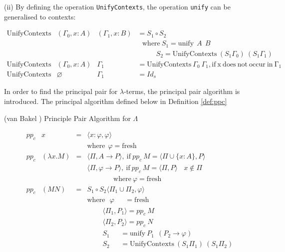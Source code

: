 \noindent (ii) By defining the operation \texttt{UnifyContexts}, the operation \texttt{unify} can be generalised to contexts:

\begin{equation*}
\begin{array}{llll}
\mathrm{UnifyContexts} & (\Gamma _0,x:A) & (\Gamma _1,x:B) & = S_1\circ S_2\\
&&&\ \ \ \mathrm{where}\ S_1 = \mathrm{unify}\ \ A\ \ B\\
&&&\ \ \ \ \ \ \ \ \ \ \ \ S_2 = \mathrm{UnifyContexts}\ (S_1\Gamma _0)\ (S_1\Gamma _1)\\
\mathrm{UnifyContexts} & (\Gamma _0,x:A) & \Gamma _1 & = \mathrm{UnifyContexts}\ \Gamma _0\ \Gamma _1, \mathrm{if\ x\ does\ not\ occur\ in\ \Gamma _1}\\
\mathrm{UnifyContexts} & \varnothing & \Gamma _1 & =  Id_s
\end{array}
\end{equation*}


In order to find the principal pair for $\lambda$-terms, the principal pair algorithm is introduced. The principal algorithm defined below in Definition \ref{def:ppc}


\begin{def1}{\label{def:ppc}}
\normalfont (van Bakel \cite{svb2001type}) Principle  Pair  Algorithm  for  $\Lambda$
\end{def1}

\begin{equation*}
\begin{array}{llll}
pp_c & x & = & \langle x:\varphi,\varphi \rangle\\
&&& \mathrm{where}\ \ \varphi=\mathrm{fresh}\\
pp_c & (\lambda x.M) & = & \langle \Pi,A \rightarrow P \rangle,\ \mathrm{if}\ pp_c\ M=\langle \Pi \cup \{x:A\},P \rangle\\
&&& \langle \Pi,\varphi \rightarrow P \rangle,\ \mathrm{if}\ pp_c\ M=\langle \Pi ,P \rangle\ \ \ \ x\not\in \Pi\\
&&&\ \ \ \ \ \ \ \ \ \ \ \ \ \ \ \ \ \mathrm{where}\ \varphi=\mathrm{fresh}\\
pp_c & (MN) & = & S_1\circ S_2\langle \Pi _1\cup \Pi _2,\varphi \rangle\\
&&& \mathrm{where}\ \ \ \varphi \ \ \ \ \ \ \ = \mathrm{fresh}\\
&&& \ \ \ \ \ \ \ \ \ \ \langle \Pi _1,P_1\rangle = pp_c\ M\\
&&& \ \ \ \ \ \ \ \ \ \ \langle \Pi _2,P_2\rangle = pp_c\ N\\
&&& \ \ \ \ \ \ \ \ \ \ S_1 \ \ \ \ \ \ \ = \mathrm{unify}\ P_1\ \ (P_2 \rightarrow \varphi)\\
&&& \ \ \ \ \ \ \ \ \ \ S_2 \ \ \ \ \ \ \ = \mathrm{UnifyContexts}\ (S_1\Pi _1)\ (S_1\Pi _2)\\
\end{array}
\end{equation*}

